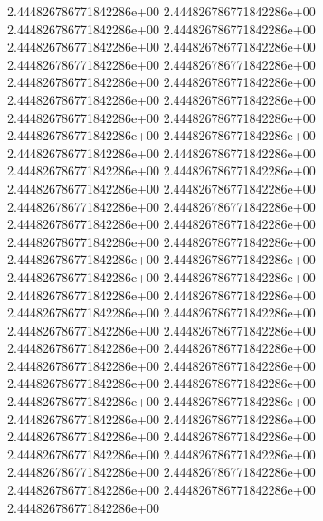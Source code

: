 2.444826786771842286e+00	2.444826786771842286e+00	2.444826786771842286e+00	2.444826786771842286e+00	2.444826786771842286e+00	2.444826786771842286e+00	2.444826786771842286e+00	2.444826786771842286e+00	2.444826786771842286e+00	2.444826786771842286e+00	2.444826786771842286e+00	2.444826786771842286e+00	2.444826786771842286e+00	2.444826786771842286e+00	2.444826786771842286e+00	2.444826786771842286e+00	2.444826786771842286e+00	2.444826786771842286e+00	2.444826786771842286e+00	2.444826786771842286e+00	2.444826786771842286e+00	2.444826786771842286e+00	2.444826786771842286e+00	2.444826786771842286e+00	2.444826786771842286e+00	2.444826786771842286e+00	2.444826786771842286e+00	2.444826786771842286e+00	2.444826786771842286e+00	2.444826786771842286e+00	2.444826786771842286e+00	2.444826786771842286e+00	2.444826786771842286e+00	2.444826786771842286e+00	2.444826786771842286e+00	2.444826786771842286e+00	2.444826786771842286e+00	2.444826786771842286e+00	2.444826786771842286e+00	2.444826786771842286e+00	2.444826786771842286e+00	2.444826786771842286e+00	2.444826786771842286e+00	2.444826786771842286e+00	2.444826786771842286e+00	2.444826786771842286e+00	2.444826786771842286e+00	2.444826786771842286e+00	2.444826786771842286e+00	2.444826786771842286e+00	2.444826786771842286e+00	2.444826786771842286e+00	2.444826786771842286e+00	2.444826786771842286e+00	2.444826786771842286e+00	2.444826786771842286e+00	2.444826786771842286e+00
